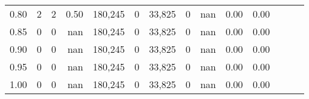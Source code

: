 \begin{tabular}{rrrrrrrrrrrrrr}
0.80 &       2 &      2 &  0.50 &  180,245 &        0 &  33,825 &       0 &   nan &  0.00 &      0.00 \\
0.85 &       0 &      0 &   nan &  180,245 &        0 &  33,825 &       0 &   nan &  0.00 &      0.00 \\
0.90 &       0 &      0 &   nan &  180,245 &        0 &  33,825 &       0 &   nan &  0.00 &      0.00 \\
0.95 &       0 &      0 &   nan &  180,245 &        0 &  33,825 &       0 &   nan &  0.00 &      0.00 \\
1.00 &       0 &      0 &   nan &  180,245 &        0 &  33,825 &       0 &   nan &  0.00 &      0.00 \\
\bottomrule
\end{tabular}
